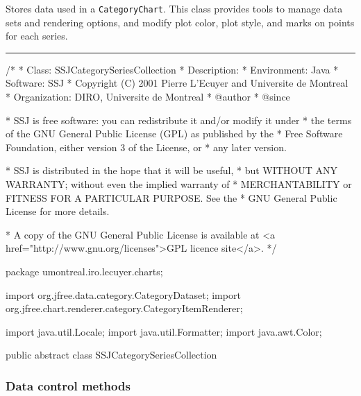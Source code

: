 
Stores data used in a \texttt{CategoryChart}.
This class provides tools to manage data sets and rendering options, and modify
plot color, plot style, and marks on points for each series.

\bigskip\hrule
\begin{code}
\begin{hide}
/*
 * Class:        SSJCategorySeriesCollection
 * Description:  
 * Environment:  Java
 * Software:     SSJ 
 * Copyright (C) 2001  Pierre L'Ecuyer and Universite de Montreal
 * Organization: DIRO, Universite de Montreal
 * @author       
 * @since

 * SSJ is free software: you can redistribute it and/or modify it under
 * the terms of the GNU General Public License (GPL) as published by the
 * Free Software Foundation, either version 3 of the License, or
 * any later version.

 * SSJ is distributed in the hope that it will be useful,
 * but WITHOUT ANY WARRANTY; without even the implied warranty of
 * MERCHANTABILITY or FITNESS FOR A PARTICULAR PURPOSE.  See the
 * GNU General Public License for more details.

 * A copy of the GNU General Public License is available at
   <a href="http://www.gnu.org/licenses">GPL licence site</a>.
 */
\end{hide}
package umontreal.iro.lecuyer.charts;\begin{hide}

import   org.jfree.data.category.CategoryDataset;
import   org.jfree.chart.renderer.category.CategoryItemRenderer;

import   java.util.Locale;
import   java.util.Formatter;
import   java.awt.Color;\end{hide}

public abstract class SSJCategorySeriesCollection \begin{hide} {
   protected CategoryItemRenderer renderer;
   protected CategoryDataset seriesCollection;
\end{hide}
\end{code}

\subsubsection*{Data control methods}

